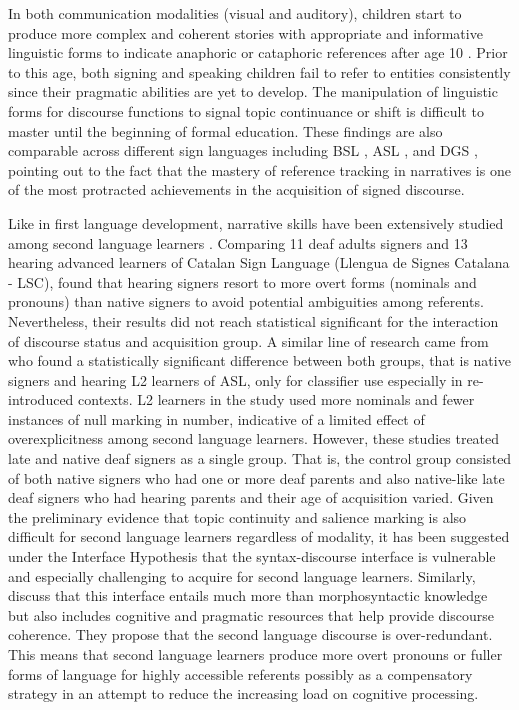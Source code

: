 \documentclass[review]{elsarticle} %
\begin{document}
In both communication modalities (visual and auditory), children start
to produce more complex and coherent stories with appropriate and
informative linguistic forms to indicate anaphoric or cataphoric
references after age 10 \citep{hickmann1996, rathmann2007}. Prior to
this age, both signing and speaking children fail to refer to entities
consistently since their pragmatic abilities are yet to develop. The
manipulation of linguistic forms for discourse functions to signal topic
continuance or shift is difficult to master until the beginning of
formal education. These findings are also comparable across different
sign languages including BSL \citep{morgan2005}, ASL \citep{loew1984},
and DGS \citep{becker2009}, pointing out to the fact that the mastery of
reference tracking in narratives is one of the most protracted
achievements in the acquisition of signed discourse.

Like in first language development, narrative skills have been
extensively studied among second language learners
\citep[see][]{bel2015, frederiksen2019}. Comparing 11 deaf adults
signers and 13 hearing advanced learners of Catalan Sign Language
(Llengua de Signes Catalana - LSC), \citet{bel2015} found that hearing
signers resort to more overt forms (nominals and pronouns) than native
signers to avoid potential ambiguities among referents. Nevertheless,
their results did not reach statistical significant for the interaction
of discourse status and acquisition group. A similar line of research
came from \citet{frederiksen2019} who found a statistically significant
difference between both groups, that is native signers and hearing L2
learners of ASL, only for classifier use especially in re-introduced
contexts. L2 learners in the study used more nominals and fewer
instances of null marking in number, indicative of a limited effect of
overexplicitness among second language learners. However, these studies
treated late and native deaf signers as a single group. That is, the
control group consisted of both native signers who had one or more deaf
parents and also native-like \citep{cormier2012} late deaf signers who
had hearing parents and their age of acquisition varied. Given the
preliminary evidence that topic continuity and salience marking is also
difficult for second language learners regardless of modality, it has
been suggested under the Interface Hypothesis that the syntax-discourse
interface is vulnerable and especially challenging to acquire
\citep{sorace2011} for second language learners. Similarly,
\citet{sorace2009} discuss that this interface entails much more than
morphosyntactic knowledge but also includes cognitive and pragmatic
resources that help provide discourse coherence. They propose that the
second language discourse is over-redundant. This means that second
language learners produce more overt pronouns or fuller forms of
language for highly accessible referents possibly as a compensatory
strategy in an attempt to reduce the increasing load on cognitive
processing.
\end{document}
